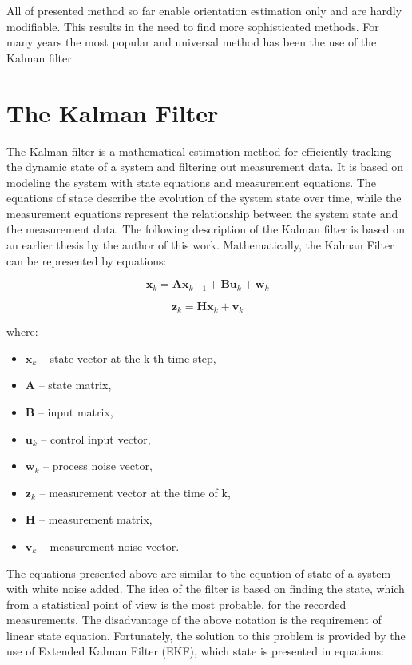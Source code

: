 All of presented method so far enable orientation estimation only and are hardly modifiable. This results in the need to find more sophisticated methods. For many years the most popular and universal method has been the use of the Kalman filter \cite{ekf_poor}.

\section{The Kalman Filter}

The Kalman filter is a mathematical estimation method for efficiently tracking the dynamic state of a system and filtering out measurement data. It is based on modeling the system with state equations and measurement equations. The equations of state describe the evolution of the system state over time, while the measurement equations represent the relationship between the system state and the measurement data.
The following description of the Kalman filter is based on an earlier thesis by the author of this work.
Mathematically, the Kalman Filter can be represented by equations:

\begin{equation}
	\bm{x}_k = \bm{A} \bm{x}_{k-1} + \bm{B} \bm{u}_k + \bm{w}_k
	\label{kf1}
\end{equation}

\begin{equation}
	\bm{z}_k = \bm{H} \bm{x}_k + \bm{v}_k
	\label{kf2}
\end{equation}

where:
\begin{itemize}[noitemsep]
	\item $\bm{x}_k$ -- state vector at the k-th time step,
	\item $\bm{A}$ -- state matrix, 
	\item $\bm{B}$  -- input matrix, 
	\item $\bm{u}_k$  -- control input vector, 
	\item $\bm{w}_k$ -- process noise vector, 
	\item $\bm{z}_k$  -- measurement vector at the time of k, 
	\item $\bm{H}$ -- measurement matrix,
	\item $\bm{v}_k$ -- measurement noise vector.
\end{itemize}

The equations presented above are similar to the equation of state of a system with white noise added. The idea of the filter is based on finding the state, which from a statistical point of view is the most probable, for the recorded measurements. The disadvantage of the above notation is the requirement of linear state equation. Fortunately, the solution to this problem is provided by the use of Extended Kalman Filter (EKF), which state is presented in equations:

